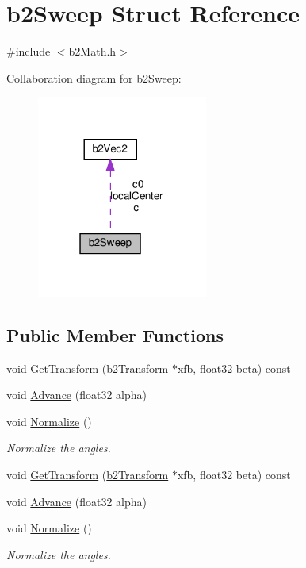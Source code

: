 \hypertarget{structb2Sweep}{}\section{b2\+Sweep Struct Reference}
\label{structb2Sweep}


{\ttfamily \#include $<$b2\+Math.\+h$>$}



Collaboration diagram for b2\+Sweep\+:
\nopagebreak
\begin{figure}[H]
\begin{center}
\leavevmode
\includegraphics[width=159pt]{structb2Sweep__coll__graph}
\end{center}
\end{figure}
\subsection*{Public Member Functions}
\begin{DoxyCompactItemize}
\item 
void \hyperlink{structb2Sweep_a22ae50509de51876aefc48cd76248c61}{Get\+Transform} (\hyperlink{structb2Transform}{b2\+Transform} $\ast$xfb, float32 beta) const
\item 
void \hyperlink{structb2Sweep_a35eb9b976ca87c9b8d758bec070c6c06}{Advance} (float32 alpha)
\item 
void \hyperlink{structb2Sweep_ad66a3086bc7656df9cf7454013a2f61b}{Normalize} ()
\begin{DoxyCompactList}\small\item\em Normalize the angles. \end{DoxyCompactList}\item 
void \hyperlink{structb2Sweep_a22ae50509de51876aefc48cd76248c61}{Get\+Transform} (\hyperlink{structb2Transform}{b2\+Transform} $\ast$xfb, float32 beta) const
\item 
void \hyperlink{structb2Sweep_a35eb9b976ca87c9b8d758bec070c6c06}{Advance} (float32 alpha)
\item 
\mbox{\label{structb2Sweep_ad66a3086bc7656df9cf7454013a2f61b}} 
void \hyperlink{structb2Sweep_ad66a3086bc7656df9cf7454013a2f61b}{Normalize} ()
\begin{DoxyCompactList}\small\item\em Normalize the angles. \end{DoxyCompactList}\end{DoxyCompactItemize}

